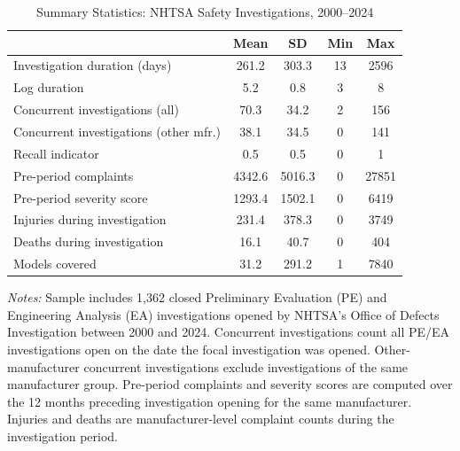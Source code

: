 \begin{table}[htbp]
\centering
\caption{Summary Statistics: NHTSA Safety Investigations, 2000--2024}
\label{tab:summ}
\begin{threeparttable}
\begin{tabular}{lcccc}
\toprule
 & Mean & SD & Min & Max \\
\midrule
Investigation duration (days) & 261.2 & 303.3 & 13 & 2596 \\
Log duration & 5.2 & 0.8 & 3 & 8 \\
Concurrent investigations (all) & 70.3 & 34.2 & 2 & 156 \\
Concurrent investigations (other mfr.) & 38.1 & 34.5 & 0 & 141 \\
Recall indicator & 0.5 & 0.5 & 0 & 1 \\
Pre-period complaints & 4342.6 & 5016.3 & 0 & 27851 \\
Pre-period severity score & 1293.4 & 1502.1 & 0 & 6419 \\
Injuries during investigation & 231.4 & 378.3 & 0 & 3749 \\
Deaths during investigation & 16.1 & 40.7 & 0 & 404 \\
Models covered & 31.2 & 291.2 & 1 & 7840 \\
\bottomrule
\end{tabular}
\begin{tablenotes}[flushleft]
\footnotesize
\item \textit{Notes:} Sample includes 1,362 closed Preliminary Evaluation (PE) and Engineering Analysis (EA) investigations opened by NHTSA's Office of Defects Investigation between 2000 and 2024. Concurrent investigations count all PE/EA investigations open on the date the focal investigation was opened. Other-manufacturer concurrent investigations exclude investigations of the same manufacturer group. Pre-period complaints and severity scores are computed over the 12 months preceding investigation opening for the same manufacturer. Injuries and deaths are manufacturer-level complaint counts during the investigation period.
\end{tablenotes}
\end{threeparttable}
\end{table}
